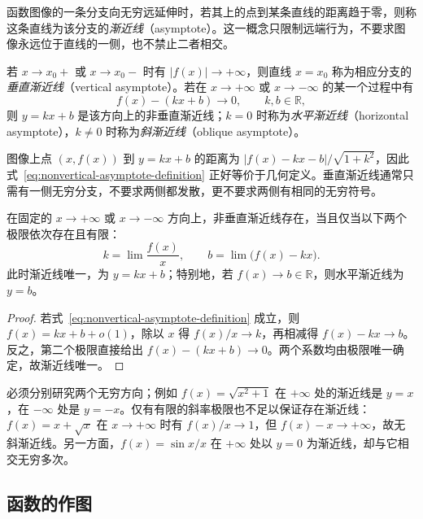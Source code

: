 \documentclass[UTF8,12pt,a4paper,fontset=fandol]{ctexbook}
\begin{document}
函数图像的一条分支向无穷远延伸时，若其上的点到某条直线的距离趋于零，则称这条直线为该分支的\emph{渐近线}（asymptote）。这一概念只限制远端行为，不要求图像永远位于直线的一侧，也不禁止二者相交。

\begin{definition}
\label{def:vertical-horizontal-oblique-asymptotes}
若 $x\to x_0+$ 或 $x\to x_0-$ 时有 $|f(x)|\to+\infty$，则直线 $x=x_0$ 称为相应分支的\emph{垂直渐近线}（vertical asymptote）。若在 $x\to+\infty$ 或 $x\to-\infty$ 的某一个过程中有
\begin{equation}
    f(x)-(kx+b)\to0,\qquad k,b\in\mathbb{R},
    \label{eq:nonvertical-asymptote-definition}
\end{equation}
则 $y=kx+b$ 是该方向上的非垂直渐近线；$k=0$ 时称为\emph{水平渐近线}（horizontal asymptote），$k\neq0$ 时称为\emph{斜渐近线}（oblique asymptote）。
\end{definition}

图像上点 $(x,f(x))$ 到 $y=kx+b$ 的距离为 $|f(x)-kx-b|/\sqrt{1+k^2}$，因此式~\eqref{eq:nonvertical-asymptote-definition} 正好等价于几何定义。垂直渐近线通常只需有一侧无穷分支，不要求两侧都发散，更不要求两侧有相同的无穷符号。

\begin{proposition}[非垂直渐近线的计算]
\label{prop:asymptote-slope-and-intercept}
在固定的 $x\to+\infty$ 或 $x\to-\infty$ 方向上，非垂直渐近线存在，当且仅当以下两个极限依次存在且有限：
\begin{equation}
    k=\lim\frac{f(x)}x,\qquad
    b=\lim\bigl(f(x)-kx\bigr).
    \label{eq:asymptote-slope-and-intercept}
\end{equation}
此时渐近线唯一，为 $y=kx+b$；特别地，若 $f(x)\to b\in\mathbb{R}$，则水平渐近线为 $y=b$。
\end{proposition}

\begin{proof}
若式~\eqref{eq:nonvertical-asymptote-definition} 成立，则 $f(x)=kx+b+o(1)$，除以 $x$ 得 $f(x)/x\to k$，再相减得 $f(x)-kx\to b$。反之，第二个极限直接给出 $f(x)-(kx+b)\to0$。两个系数均由极限唯一确定，故渐近线唯一。
\end{proof}

必须分别研究两个无穷方向；例如 $f(x)=\sqrt{x^2+1}$ 在 $+\infty$ 处的渐近线是 $y=x$，在 $-\infty$ 处是 $y=-x$。仅有有限的斜率极限也不足以保证存在渐近线：$f(x)=x+\sqrt{x}$ 在 $x\to+\infty$ 时有 $f(x)/x\to1$，但 $f(x)-x\to+\infty$，故无斜渐近线。另一方面，$f(x)=\sin x/x$ 在 $+\infty$ 处以 $y=0$ 为渐近线，却与它相交无穷多次。

\subsection{函数的作图}
\label{subsec:graphing-functions}
\end{document}
